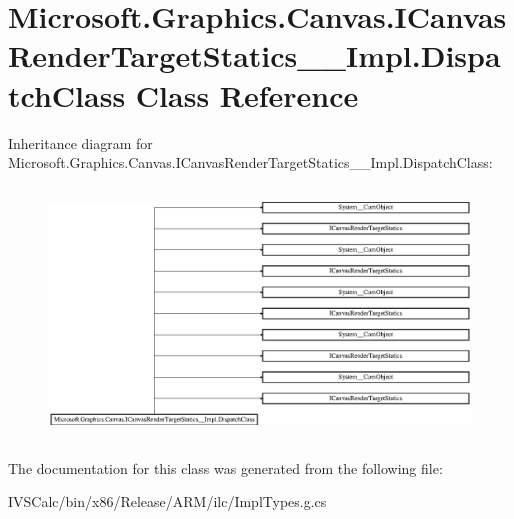 \hypertarget{class_microsoft_1_1_graphics_1_1_canvas_1_1_i_canvas_render_target_statics_____impl_1_1_dispatch_class}{}\section{Microsoft.\+Graphics.\+Canvas.\+I\+Canvas\+Render\+Target\+Statics\+\_\+\+\_\+\+Impl.\+Dispatch\+Class Class Reference}
\label{class_microsoft_1_1_graphics_1_1_canvas_1_1_i_canvas_render_target_statics_____impl_1_1_dispatch_class}
Inheritance diagram for Microsoft.\+Graphics.\+Canvas.\+I\+Canvas\+Render\+Target\+Statics\+\_\+\+\_\+\+Impl.\+Dispatch\+Class\+:\begin{figure}[H]
\begin{center}
\leavevmode
\includegraphics[height=6.710239cm]{class_microsoft_1_1_graphics_1_1_canvas_1_1_i_canvas_render_target_statics_____impl_1_1_dispatch_class}
\end{center}
\end{figure}


The documentation for this class was generated from the following file\+:\begin{DoxyCompactItemize}
\item 
I\+V\+S\+Calc/bin/x86/\+Release/\+A\+R\+M/ilc/Impl\+Types.\+g.\+cs\end{DoxyCompactItemize}
